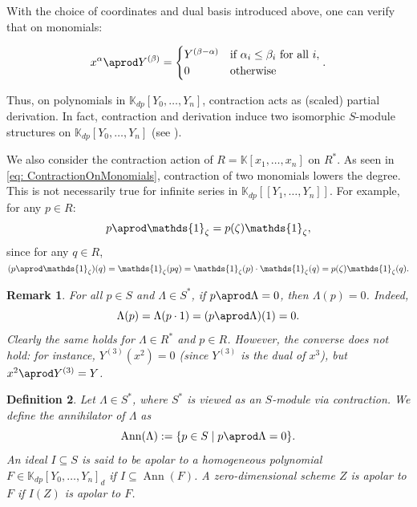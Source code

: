 \documentclass[a4paper,11p]{amsart}
\newtheorem{defn0}{Definition}[section]
\newtheorem{remark0}[defn0]{Remark}
\newenvironment{definition}{ \begin{defn0}}{\end{defn0}}
\newenvironment{remark}{ \begin{remark0}\rm}{\end{remark0}}
\newcommand{\K}{\mathbb K}
\begin{document}
With the choice of coordinates and dual basis introduced above, one can verify that on monomials:

\begin{equation}\label{eq: ContractionOnMonomials}
x^{\alpha} \aprod Y^{(\beta)} =
\begin{cases}
Y^{(\beta - \alpha)} & \text{if } \alpha_i \leq \beta_i \text{ for all } i, \\
0 & \text{otherwise}
\end{cases}.
\end{equation}

Thus, on polynomials in $\K_{dp}[Y_0, \ldots, Y_n]$, contraction acts as (scaled) partial derivation. In fact, contraction and derivation induce two isomorphic $S$-module structures on $\K_{dp}[Y_0, \ldots, Y_n]$ (see \cite[Proposition 3.13]{Joachim}).

\bigskip

We also consider the contraction action of $R = \K[x_1, \ldots, x_n]$ on $R^*$. As seen in \eqref{eq: ContractionOnMonomials}, contraction of two monomials lowers the degree. This is not necessarily true for infinite series in $\K_{dp}[[Y_1, \ldots, Y_n]]$. For example, for any $p \in R$:
\[
p \aprod \mathds{1}_{\zeta} = p(\zeta)\mathds{1}_\zeta,
\]
since for any $q \in R$,
$
(p \aprod \mathds{1}_\zeta)(q) = \mathds{1}_\zeta(pq) = \mathds{1}_\zeta(p) \cdot \mathds{1}_\zeta(q) = p(\zeta) \mathds{1}_\zeta(q).
$

\begin{remark}\label{remark: contrVsorth}
    For all $p \in S$ and $\Lambda \in S^*$, if $p \aprod \Lambda = 0$, then $\Lambda(p) = 0$. Indeed,
    \[
    \Lambda(p) = \Lambda(p \cdot 1) = (p \aprod \Lambda)(1) = 0.
    \]
    Clearly the same holds for $\Lambda \in R^*$ and $p \in R$. However, the converse does not hold: for instance, $Y^{(3)}(x^2) = 0$ (since $Y^{(3)}$ is the dual of $x^3$), but $x^2 \aprod Y^{(3)} = Y$.
\end{remark}

\begin{definition}
    Let $\Lambda \in S^*$, where $S^*$ is viewed as an $S$-module via contraction. We define the \emph{annihilator} of $\Lambda$ as
    \[
    \operatorname{Ann}(\Lambda) := \{ p \in S \mid p \aprod \Lambda = 0 \}.
    \]
    An ideal $I \subseteq S$ is said to be \emph{apolar} to a homogeneous polynomial $F \in \K_{dp}[Y_0, \ldots, Y_n]_d$ if $I \subseteq \operatorname{Ann}(F)$. A zero-dimensional scheme $Z$ is apolar to $F$ if $I(Z)$ is apolar to $F$.
\end{definition}
\end{document}
